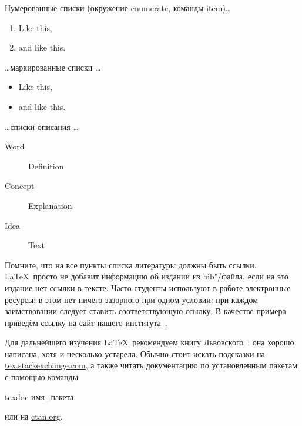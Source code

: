 Нумерованные списки (окружение enumerate, команды item)…

\begin{enumerate}
  \item Like this,
  \item and like this.
\end{enumerate}

\dots маркированные списки \dots

\begin{itemize}
  \item Like this,
  \item and like this.
\end{itemize}

\dots списки-описания \dots

\begin{description}
  \item[Word] Definition
  \item[Concept] Explanation
  \item[Idea] Text
\end{description}

\Conc

Помните, что на все пункты списка литературы должны быть ссылки. \LaTeX\ просто не добавит информацию об издании из bib"/файла, если на это издание нет ссылки в тексте. Часто студенты используют в работе  электронные ресурсы: в этом нет ничего зазорного при одном условии: при каждом заимствовании следует ставить соответствующую ссылку. В качестве примера приведём ссылку на сайт нашего института~\autocite{mmcs}.

Для дальнейшего изучения \LaTeX\ рекомендуем книгу Львовского~\autocite{Lvo2003}: она хорошо написана, хотя и несколько устарела.
Обычно стоит искать подсказки на
\href{http://tex.stackexchange.com/}{tex.stackexchange.com}, а также
читать документацию по установленным пакетам с помощью
команды
\begin{Verb}
texdoc имя_пакета
\end{Verb}
или на \href{http://ctan.org/}{ctan.org}.

\printbibliography[%
    heading=bibintoc%
]

